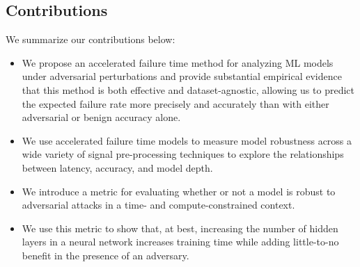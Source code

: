 \subsection{Contributions}

We summarize our contributions below:
\begin{itemize}
	\item We propose an accelerated failure time method for analyzing ML models under adversarial perturbations and provide substantial empirical evidence that this method is both effective and dataset-agnostic, allowing us to predict the expected failure rate more precisely and accurately than with either adversarial or benign accuracy alone.
	\item We use accelerated failure time models to measure model robustness across a wide variety of signal pre-processing techniques to explore the relationships between latency, accuracy, and model depth.
	\item We introduce a metric for evaluating whether or not a model is robust to adversarial attacks in a time- and compute-constrained context.
	\item We use this metric to show that, at best, increasing the number of hidden layers in a neural network increases training time while adding little-to-no benefit in the presence of an adversary.
\end{itemize}

